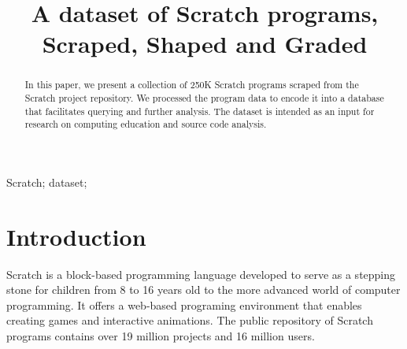 \documentclass[10pt, conference]{IEEEtran}
\begin{document}
\title{A dataset of Scratch programs,\\Scraped, Shaped and Graded}


\author{
	
}

\maketitle


\begin{abstract}
In this paper, we present a collection of 250K Scratch programs scraped from the Scratch project repository. We processed the program data to encode it into a database that facilitates querying and further analysis. The dataset is intended as an input for research on computing education and source code analysis.
\end{abstract}

\begin{IEEEkeywords}
Scratch; dataset;
\end{IEEEkeywords}


 
\section{Introduction}
Scratch \cite{resnick_scratch:_2009} is a block-based programming language developed to serve as a stepping stone for children from 8 to 16 years old to the more advanced world of computer programming.
It offers a web-based programing environment that enables creating games and interactive animations. The public repository of Scratch programs contains over 19 million projects and 16 million users.
\end{document}
